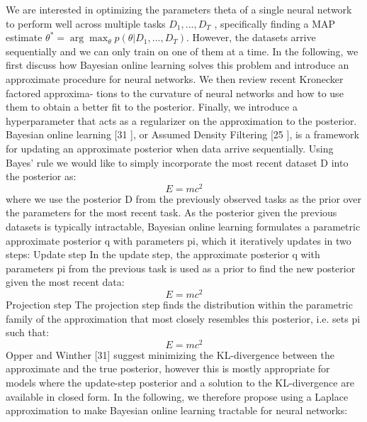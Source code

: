 
We are interested in optimizing the parameters theta of a single neural network to perform well across
multiple tasks $D_1, ...,D_T$ , specifically finding a MAP estimate $\theta^*=\arg\max_\theta p(\theta|D_1,...,D_T)$.
However, the datasets arrive sequentially and we can only train on one of them at a time.
In the following, we first discuss how Bayesian online learning solves this problem and introduce an
approximate procedure for neural networks. We then review recent Kronecker factored approxima-
tions to the curvature of neural networks and how to use them to obtain a better fit to the posterior.
Finally, we introduce a hyperparameter that acts as a regularizer on the approximation to the posterior.\\
Bayesian online learning [31 ], or Assumed Density Filtering [25 ], is a framework for updating an
approximate posterior when data arrive sequentially. Using Bayes’ rule we would like to simply
incorporate the most recent dataset D into the posterior as:
\begin{equation}
	E = mc^2
\end{equation}
where we use the posterior D from the previously observed tasks as the prior over the
parameters for the most recent task. As the posterior given the previous datasets is typically intractable,
Bayesian online learning formulates a parametric approximate posterior q with parameters pi, which
it iteratively updates in two steps:
Update step In the update step, the approximate posterior q with parameters pi from the previous
task is used as a prior to find the new posterior given the most recent data:
\begin{equation}
	E = mc^2
\end{equation}
Projection step The projection step finds the distribution within the parametric family of the
approximation that most closely resembles this posterior, i.e. sets pi such that:
\begin{equation}
	E = mc^2
\end{equation}
Opper and Winther [31] suggest minimizing the KL-divergence between the approximate and the
true posterior, however this is mostly appropriate for models where the update-step posterior and a
solution to the KL-divergence are available in closed form. In the following, we therefore propose
using a Laplace approximation to make Bayesian online learning tractable for neural networks: